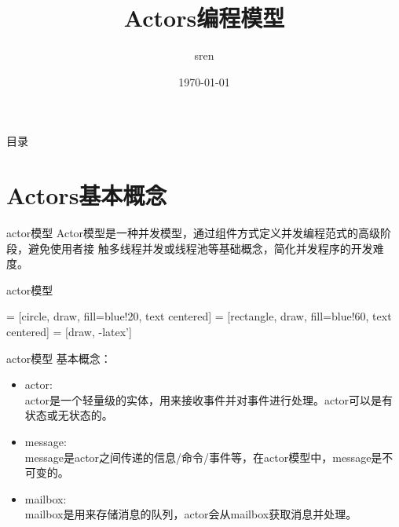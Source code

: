 \documentclass[UTF8]{ctexbeamer}
\begin{document}
\begin{frame}
  \title{Actors编程模型} \author{sren} \date{\today}
  \maketitle
\end{frame}

\begin{frame}
  \begin{center}目录\end{center}
  \normalsize
  \tableofcontents
\end{frame}

\section{Actors基本概念}
\frame{\tableofcontents[currentsection]} %

\begin{frame}{actor模型}
  Actor模型是一种并发模型，通过组件方式定义并发编程范式的高级阶段，避免使用者接
  触多线程并发或线程池等基础概念，简化并发程序的开发难度。\\
\end{frame}

\begin{frame}{actor模型}
  \begin{center}
     = [circle, draw, fill=blue!20, text centered]
     = [rectangle, draw, fill=blue!60, text centered]
     = [draw, -latex']

  \end{center}
\end{frame}

\begin{frame}{actor模型}
  基本概念：
  \begin{itemize}
  \item actor:\\
    actor是一个轻量级的实体，用来接收事件并对事件进行处理。actor可以是有状态或无状态的。
  \item message:\\
    message是actor之间传递的信息/命令/事件等，在actor模型中，message是不可变的。
  \item mailbox:\\
    mailbox是用来存储消息的队列，actor会从mailbox获取消息并处理。
  \end{itemize}
\end{frame}
\end{document}
